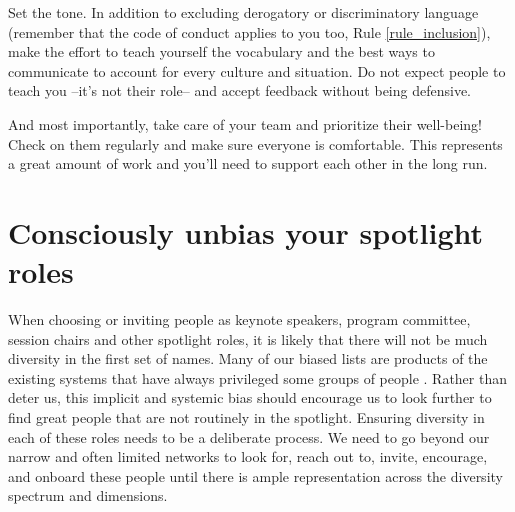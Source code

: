 \documentclass[10pt,letterpaper]{article}
\begin{document}
Set the tone. %
In addition to excluding derogatory or discriminatory language (remember that the code of conduct applies to you too, Rule \ref{rule_inclusion}), make the effort to teach yourself the vocabulary and the best ways to communicate to account for every culture and situation. Do not expect people to teach you --it's not their role-- and accept feedback without being defensive.

And most importantly, take care of your team and prioritize their well-being! Check on them regularly and make sure everyone is comfortable. This represents a great amount of work and you'll need to support each other in the long run.


\section{Consciously unbias your spotlight roles}
\label{rule_spotlight}

When choosing or inviting people as keynote speakers, program committee, session chairs and other spotlight roles, it is likely that there will not be much diversity in the first set of names. Many of our biased lists are products of the existing systems that have always privileged some groups of people \cite{dwyerNoticeWhoScience2021,swartzScienceValueDiversity2019,wongBuildDiversityScience2020,dignazioUnicornsJanitorsNinjas2020}. Rather than deter us, this implicit and systemic bias should encourage us to look further to find great people that are not routinely in the spotlight. 
Ensuring diversity in each of these roles needs to be a deliberate process. We need to go beyond our narrow and often limited networks to look for, reach out to, invite, encourage, and onboard these people until there is ample representation across the diversity spectrum and dimensions. 
\end{document}
